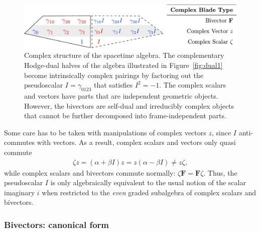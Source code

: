 \documentclass[1p,sort&compress]{elsarticle}
\numberwithin{equation}{section}
\newcommand{\bv}[1]{\mathbf{#1}}
\begin{document}
\begin{figure}[t]
  \begin{center}
    \includegraphics[width=\columnwidth]{Fig5.pdf}
  \end{center}
  \caption[Complex structure]{Complex structure of the spacetime algebra.  The complementary Hodge-dual halves of the algebra illustrated in Figure~\ref{fig:dual1} become intrinsically complex pairings by factoring out the pseudoscalar $I = \gamma_{0123}$ that satisfies $I^2 = -1$.  The complex scalars and vectors have parts that are independent geometric objects.  However, the bivectors are self-dual and irreducibly complex objects that cannot be further decomposed into frame-independent parts.}
  \label{fig:dual2}
\end{figure}

Some care has to be taken with manipulations of complex vectors $z$, since $I$ anti-commutes with vectors.  As a result, complex scalars and vectors only quasi commute 
\begin{align}
  \zeta z = (\alpha + \beta I) z = z (\alpha - \beta I) \neq z \zeta,
\end{align}
while complex scalars and bivectors commute normally: $\zeta \bv{F} = \bv{F} \zeta$.  Thus, the pseudoscalar $I$ is only algebraically equivalent to the usual notion of the scalar imaginary $i$ when restricted to the \emph{even} graded subalgebra of complex scalars and bivectors.


\subsubsection{Bivectors: canonical form}\label{sec:complexbivectors}

\end{document}
